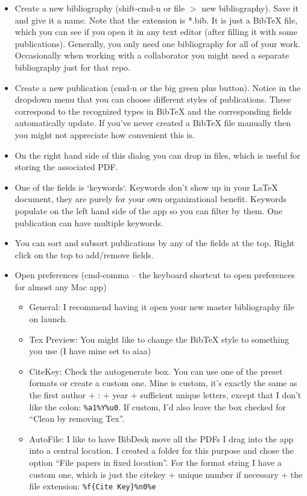 \begin{itemize}
\item Create a new bibliography (shift-cmd-n or file $>$ new bibliography).  Save it and give it a name.  Note that the extension is *.bib.  It is just a BibTeX file, which you can see if you open it in any text editor (after filling it with some publications).  Generally, you only need one bibliography for all of your work.  Occasionally when working with a collaborator you might need a separate bibliography just for that repo.
\item Create a new publication (cmd-n or the big green plus button).  Notice in the dropdown menu that you can choose different styles of publications.  These correspond to the recognized types in BibTeX and the corresponding fields automatically update.  If you've never created a BibTeX file manually then you might not appreciate how convenient this is.  
\item On the right hand side of this dialog you can drop in files, which is useful for storing the associated PDF. 
\item One of the fields is `keywords`.  Keywords don't show up in your LaTeX document, they are purely for your own organizational benefit.  Keywords populate on the left hand side of the app so you can filter by them.  One publication can have multiple keywords.
\item You can sort and subsort publications by any of the fields at the top.  Right click on the top to add/remove fields.
\item Open preferences (cmd-comma -- the keyboard shortcut to open preferences for almost any Mac app)
\begin{itemize}
    \item General: I recommend having it open your new master bibliography file on launch.
    \item Tex Preview: You might like to change the BibTeX style to something you use (I have mine set to aiaa)
    \item CiteKey: Check the autogenerate box.  You can use one of the preset formats or create a custom one.  Mine is custom, it's exactly the same as the first author + : + year + sufficient unique letters, except that I don't like the colon: \texttt{\%a1\%Y\%u0}.  If custom, I'd also leave the box checked for ``Clean by removing Tex''.
    \item AutoFile: I like to have BibDesk move all the PDFs I drag into the app into a central location.  I created a folder for this purpose and chose the option ``File papers in fixed location''.  For the format string I have a custom one, which is just the citekey + unique number if necessary + the file extension: \texttt{\%f\{Cite Key\}\%n0\%e}

\end{itemize}
\end{itemize}
